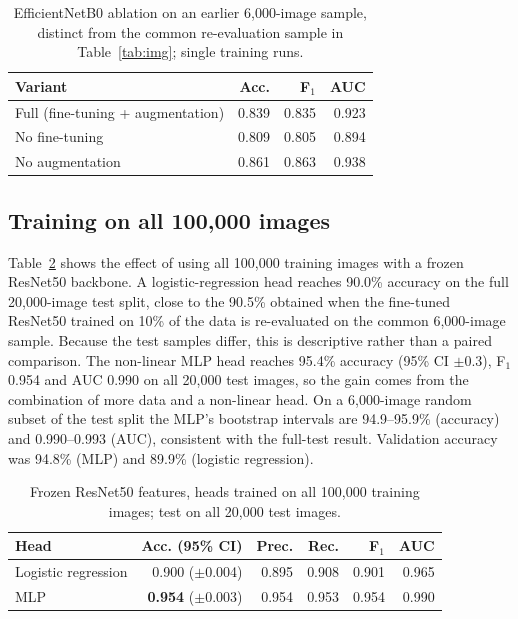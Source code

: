 \documentclass[11pt,a4paper]{article}
\begin{document}
\begin{table}[h]
\centering
\caption{EfficientNetB0 ablation on an earlier 6{,}000-image sample, distinct from the common
re-evaluation sample in Table~\ref{tab:img}; single training runs.}\label{tab:abl}
\begin{tabular}{lrrr}
\toprule
Variant & Acc. & F$_1$ & AUC \\
\midrule
Full (fine-tuning + augmentation) & 0.839 & 0.835 & 0.923 \\
No fine-tuning & 0.809 & 0.805 & 0.894 \\
No augmentation & 0.861 & 0.863 & 0.938 \\
\bottomrule
\end{tabular}
\end{table}

\subsection{Training on all 100{,}000 images}\label{sec:full}
Table~\ref{tab:full} shows the effect of using all 100{,}000 training images with a frozen ResNet50 backbone. A logistic-regression head reaches 90.0\% accuracy on the full 20{,}000-image test split, close to the 90.5\% obtained when the fine-tuned ResNet50 trained on 10\% of the data is re-evaluated on the common 6{,}000-image sample. Because the test samples differ, this is descriptive rather than a paired comparison. The non-linear MLP head reaches 95.4\% accuracy (95\% CI $\pm$0.3), F$_1$ 0.954 and AUC 0.990 on all 20{,}000 test images, so the gain comes from the combination of more data and a non-linear head. On a 6{,}000-image random subset of the test split the MLP's bootstrap intervals are 94.9--95.9\% (accuracy) and 0.990--0.993 (AUC), consistent with the full-test result. Validation accuracy was 94.8\% (MLP) and 89.9\% (logistic regression).

\begin{table}[h]
\centering
\caption{Frozen ResNet50 features, heads trained on all 100{,}000 training images; test on all 20{,}000 test images.}\label{tab:full}
\begin{tabular}{lrrrrr}
\toprule
Head & Acc. (95\% CI) & Prec. & Rec. & F$_1$ & AUC \\
\midrule
Logistic regression & 0.900 ($\pm$0.004) & 0.895 & 0.908 & 0.901 & 0.965 \\
MLP & \textbf{0.954} ($\pm$0.003) & 0.954 & 0.953 & 0.954 & 0.990 \\
\bottomrule
\end{tabular}
\end{table}
\end{document}
